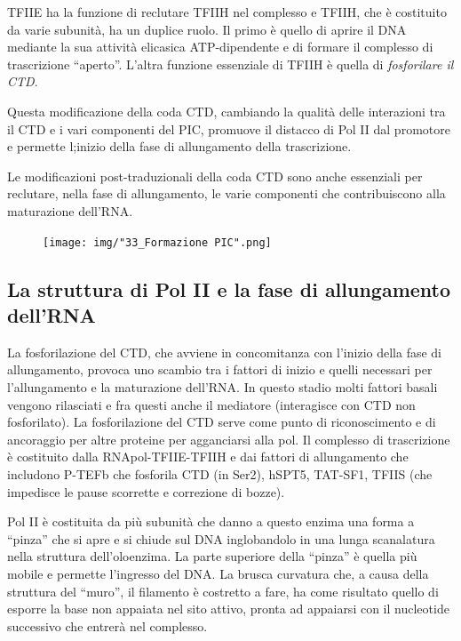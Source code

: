 \documentclass[11pt]{book}
\begin{document}
TFIIE ha la funzione di reclutare TFIIH nel complesso e TFIIH, che è
costituito da varie subunità, ha un duplice ruolo. Il primo è quello di
aprire il DNA mediante la sua attività elicasica ATP-dipendente e di
formare il complesso di trascrizione ``aperto''. L'altra funzione
essenziale di TFIIH è quella di \emph{fosforilare il CTD}.

Questa modificazione della coda CTD, cambiando la qualità delle
interazioni tra il CTD e i vari componenti del PIC, promuove il distacco
di Pol II dal promotore e permette l;inizio della fase di allungamento
della trascrizione.

Le modificazioni post-traduzionali della coda CTD sono anche essenziali
per reclutare, nella fase di allungamento, le varie componenti che
contribuiscono alla maturazione dell'RNA.

\begin{figure}[htp]
\centering
\texttt{[image: img/"33\_Formazione PIC".png]}
\caption{}
\label{formazione-pic}
\end{figure}


\subsection{La struttura di Pol II e la fase di allungamento
dell'RNA}\label{la-struttura-di-pol-ii-e-la-fase-di-allungamento-dellrna}

La fosforilazione del CTD, che avviene in concomitanza con l'inizio
della fase di allungamento, provoca uno scambio tra i fattori di inizio
e quelli necessari per l'allungamento e la maturazione dell'RNA. In
questo stadio molti fattori basali vengono rilasciati e fra questi anche
il mediatore (interagisce con CTD non fosforilato). La fosforilazione
del CTD serve come punto di riconoscimento e di ancoraggio per altre
proteine per agganciarsi alla pol. Il complesso di trascrizione è
costituito dalla RNApol-TFIIE-TFIIH e dai fattori di allungamento che
includono P-TEFb che fosforila CTD (in Ser2), hSPT5, TAT-SF1, TFIIS (che
impedisce le pause scorrette e correzione di bozze).

Pol II è costituita da più subunità che danno a questo enzima una forma
a ``pinza'' che si apre e si chiude sul DNA inglobandolo in una lunga
scanalatura nella struttura dell'oloenzima. La parte superiore della
``pinza'' è quella più mobile e permette l'ingresso del DNA. La brusca
curvatura che, a causa della struttura del ``muro'', il filamento è
costretto a fare, ha come risultato quello di esporre la base non
appaiata nel sito attivo, pronta ad appaiarsi con il nucleotide
successivo che entrerà nel complesso.
\end{document}

